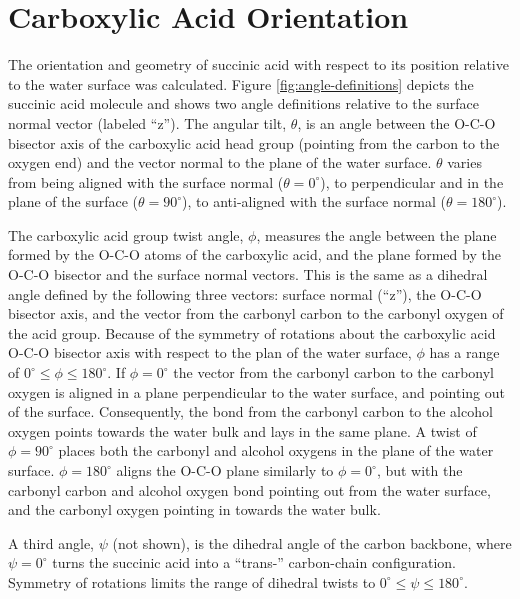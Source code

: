 \section {Carboxylic Acid Orientation}

The orientation and geometry of succinic acid with respect to its position relative to the water surface was calculated. Figure \ref{fig:angle-definitions} depicts the succinic acid molecule and shows two angle definitions relative to the surface normal vector (labeled ``z''). The angular tilt, $\theta$, is an angle between the O-C-O bisector axis of the carboxylic acid head group (pointing from the carbon to the oxygen end) and the vector normal to the plane of the water surface. $\theta$ varies from being aligned with the surface normal ($\theta=0^{\circ}$), to perpendicular and in the plane of the surface ($\theta=90^{\circ}$), to anti-aligned with the surface normal ($\theta=180^{\circ}$). 

The carboxylic acid group twist angle, $\phi$, measures the angle between the plane formed by the O-C-O atoms of the carboxylic acid, and the plane formed by the O-C-O bisector and the surface normal vectors. This is the same as a dihedral angle defined by the following three vectors: surface normal (``z''), the O-C-O bisector axis, and the vector from the carbonyl carbon to the carbonyl oxygen of the acid group. Because of the symmetry of rotations about the carboxylic acid O-C-O bisector axis with respect to the plan of the water surface, $\phi$ has a range of $0^{\circ} \le \phi \le 180^{\circ}$. If $\phi=0^{\circ}$ the vector from the carbonyl carbon to the carbonyl oxygen is aligned in a plane perpendicular to the water surface, and pointing out of the surface. Consequently, the bond from the carbonyl carbon to the alcohol oxygen points towards the water bulk and lays in the same plane. A twist of $\phi=90^{\circ}$ places both the carbonyl and alcohol oxygens in the plane of the water surface. $\phi=180^{\circ}$ aligns the O-C-O plane similarly to $\phi=0^{\circ}$, but with the carbonyl carbon and alcohol oxygen bond pointing out from the water surface, and the carbonyl oxygen pointing in towards the water bulk. 

A third angle, $\psi$ (not shown), is the dihedral angle of the carbon backbone, where $\psi = 0^{\circ}$ turns the succinic acid into a ``trans-'' carbon-chain configuration. Symmetry of rotations limits the range of dihedral twists to $0^{\circ} \le \psi \le 180^{\circ}$.


